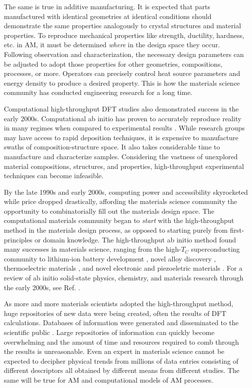 The same is true in additive manufacturing. It is expected that parts manufactured with identical geometries at identical conditions should demonstrate the same properties analogously to crystal structures and material properties. To reproduce mechanical properties like strength, ductility, hardness, etc. in AM, it must be determined \textit{where} in the design space they occur. Following observation and characterization, the necessary design parameters can be adjusted to adopt those properties for other geometries, compositions, processes, or more. Operators can precisely control heat source parameters and energy density to produce a desired property. This is how the materials science community has conducted engineering research for a long time.

Computational high-throughput DFT studies also demonstrated success in the early 2000s. Computational ab initio has proven to accurately reproduce reality in many regimes when compared to experimental results \cite{Curtarolo2005}. While research groups may have access to rapid deposition techniques, it is expensive to manufacture swaths of composition-structure space. It also takes considerable time to manufacture and characterize samples. Considering the vastness of unexplored material compositions, structures, and properties, high-throughput experimental techniques can become infeasible. 

By the late 1990s and early 2000s, computing power and accessibility skyrocketed while price dropped drastically, affording the materials science community the opportunity to combinatorially fill out the materials design space. The computational materials community began to \textit{start} with the high-throughput method in the materials design process, as opposed to starting purely from first-principles or domain knowledge. The high-throughput ab initio method found many successes in materials science, ranging from the high-$T_C$ superconducting community \cite{Kolmogorov2006} to lithium-ion battery development \cite{Chen2012, Hautier2013, Kang2006, Kirklin2013}, novel alloy discovery \cite{Hautier2010, Ciobanu2005}, thermoelectric materials \cite{Wang2011, Yan2015}, and novel electronic and piezoeletric materials \cite{Setyawan2010, Roy2012, Bennett2012, DeJong2015}. For a review of ab initio solid-state physics, chemistry, and materials research through the early 2000s, see Ref. \cite{Curtarolo2013}.

As more and more materials scientists adopted the high-throughput method, huge repositories of new data were being created, often the results of DFT calculations. Databases of information were generated and disseminated to the scientific public \cite{ Setyawan2010, Setyawan2011, Curtarolo2012, Curtarolo2012a, Jain2011, Jain2013}. Large repositories of information can quickly become overwhelming and the amount of time and resources required to comb through the results is unreasonable. Even an expert in materials science cannot be expected to decipher physical trends from millions of data entries consisting of different descriptors all obtained by different means from different studies. The same will be true for AM and computational models of AM processes.

